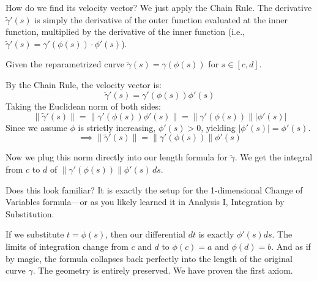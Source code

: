 \begin{spoken-clean}[00:16:30 - 00:17:45]
How do we find its velocity vector? We just apply the Chain Rule. The derivative $\tilde{\gamma}'(s)$ is simply the derivative of the outer function evaluated at the inner function, multiplied by the derivative of the inner function (i.e., $\tilde{\gamma}'(s) = \gamma'(\phi(s)) \cdot \phi'(s)$). 
\end{spoken-clean}

\begin{math-stroke}
Given the reparametrized curve $\tilde{\gamma}(s) = \gamma(\phi(s))$ for $s \in [c, d]$.

By the Chain Rule, the velocity vector is:
\[
\tilde{\gamma}'(s) = \gamma'(\phi(s)) \phi'(s)
\]
Taking the Euclidean norm of both sides:
\[
\|\tilde{\gamma}'(s)\| = \|\gamma'(\phi(s)) \phi'(s)\| = \|\gamma'(\phi(s))\| |\phi'(s)|
\]
Since we assume $\phi$ is strictly increasing, $\phi'(s) > 0$, yielding $|\phi'(s)| = \phi'(s)$.
\[
\implies \|\tilde{\gamma}'(s)\| = \|\gamma'(\phi(s))\| \phi'(s)
\]
\end{math-stroke}

\begin{spoken-clean}[00:17:45 - 00:19:00]
Now we plug this norm directly into our length formula for $\tilde{\gamma}$. We get the integral from $c$ to $d$ of $\|\gamma'(\phi(s))\| \phi'(s) \, ds$. 

Does this look familiar? It is exactly the setup for the 1-dimensional Change of Variables formula—or as you likely learned it in Analysis I, Integration by Substitution. 
\end{spoken-clean}

\begin{spoken-clean}[00:19:00 - 00:20:00]
If we substitute $t = \phi(s)$, then our differential $dt$ is exactly $\phi'(s) ds$. The limits of integration change from $c$ and $d$ to $\phi(c)=a$ and $\phi(d)=b$. And as if by magic, the formula collapses back perfectly into the length of the original curve $\gamma$. The geometry is entirely preserved. We have proven the first axiom.
\end{spoken-clean}

